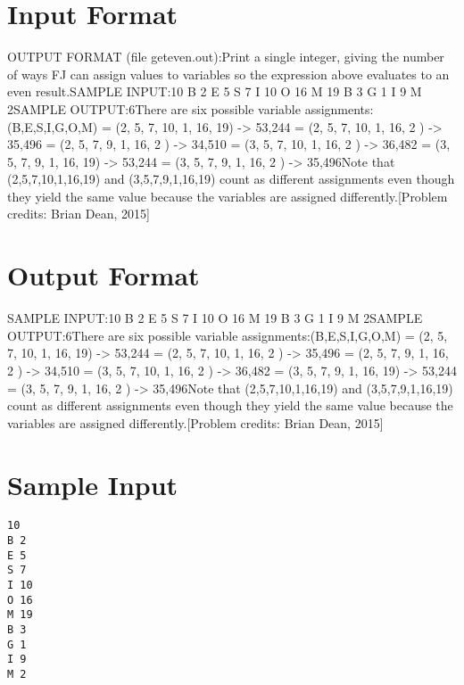 \documentclass[12pt]{article}
\begin{document}
\section*{Input Format}
OUTPUT FORMAT (file geteven.out):Print a single integer, giving the number of ways FJ can assign values to
variables so the expression above evaluates to an even result.SAMPLE INPUT:10
B 2
E 5
S 7
I 10
O 16
M 19
B 3
G 1
I 9
M 2SAMPLE OUTPUT:6There are six possible variable assignments:(B,E,S,I,G,O,M) = (2, 5, 7, 10, 1, 16, 19) -> 53,244
                = (2, 5, 7, 10, 1, 16, 2 ) -> 35,496
                = (2, 5, 7, 9,  1, 16, 2 ) -> 34,510
                = (3, 5, 7, 10, 1, 16, 2 ) -> 36,482
                = (3, 5, 7, 9,  1, 16, 19) -> 53,244
                = (3, 5, 7, 9,  1, 16, 2 ) -> 35,496Note that (2,5,7,10,1,16,19) and (3,5,7,9,1,16,19) count as different
assignments even though they yield the same value because the variables are
assigned differently.[Problem credits: Brian Dean, 2015]

\section*{Output Format}
SAMPLE INPUT:10
B 2
E 5
S 7
I 10
O 16
M 19
B 3
G 1
I 9
M 2SAMPLE OUTPUT:6There are six possible variable assignments:(B,E,S,I,G,O,M) = (2, 5, 7, 10, 1, 16, 19) -> 53,244
                = (2, 5, 7, 10, 1, 16, 2 ) -> 35,496
                = (2, 5, 7, 9,  1, 16, 2 ) -> 34,510
                = (3, 5, 7, 10, 1, 16, 2 ) -> 36,482
                = (3, 5, 7, 9,  1, 16, 19) -> 53,244
                = (3, 5, 7, 9,  1, 16, 2 ) -> 35,496Note that (2,5,7,10,1,16,19) and (3,5,7,9,1,16,19) count as different
assignments even though they yield the same value because the variables are
assigned differently.[Problem credits: Brian Dean, 2015]

\section*{Sample Input}
\begin{verbatim}
10
B 2
E 5
S 7
I 10
O 16
M 19
B 3
G 1
I 9
M 2
\end{verbatim}
\end{document}
